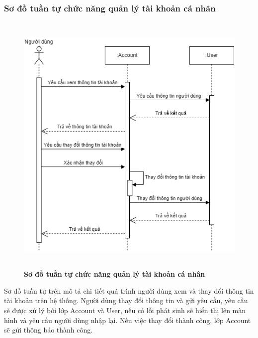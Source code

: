 \subsubsection{Sơ đồ tuần tự chức năng quản lý tài khoản cá nhân}
\begin{figure}[H]
  \centering
  \includegraphics[width=13cm,height=13cm]{Images/sequence/sequence_manage_info.png}
  \caption[Sơ đồ tuần tự chức năng quản lý tài khoản cá nhân]{\bfseries \fontsize{12pt}{0pt}
  \selectfont Sơ đồ tuần tự chức năng quản lý tài khoản cá nhân}
  \label{sequence_account} %
\end{figure}
Sơ đồ tuần tự trên mô tả chi tiết quá trình người dùng xem và thay đổi thông tin tài khoản trên hệ thống. Người dùng thay đổi thông tin và gửi yêu cầu, 
yêu cầu sẽ được xử lý bởi lớp Account và User, nếu có lỗi phát sinh sẽ hiển thị lên màn hình và yêu cầu người dùng nhập lại. Nếu việc thay đổi thành công, lớp Account sẽ gửi thông báo 
thành công.  

